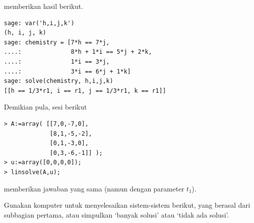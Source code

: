 \begin{exercises}
\begin{answer}
\begin{exparts}
\Sage{} memberikan hasil berikut.
\begin{lstlisting}
sage: var('h,i,j,k')
(h, i, j, k)
sage: chemistry = [7*h == 7*j,
....:              8*h + 1*i == 5*j + 2*k,
....:              1*i == 3*j,
....:              3*i == 6*j + 1*k]
sage: solve(chemistry, h,i,j,k)
[[h == 1/3*r1, i == r1, j == 1/3*r1, k == r1]]          
\end{lstlisting}
Demikian pula, sesi \Maple{} berikut 
\begin{lstlisting}
> A:=array( [[7,0,-7,0],
             [8,1,-5,-2],
             [0,1,-3,0],
             [0,3,-6,-1]] );
> u:=array([0,0,0,0]);
> linsolve(A,u);
\end{lstlisting}
         memberikan jawaban yang sama (namun dengan parameter $t_1$).
      \end{exparts}
    \end{answer}
\item 
    Gunakan komputer untuk menyelesaikan sistem-sistem berikut, yang berasal dari
    subbagian pertama,
    atau simpulkan `banyak solusi' atau `tidak ada solusi'.
\end{exercises}
